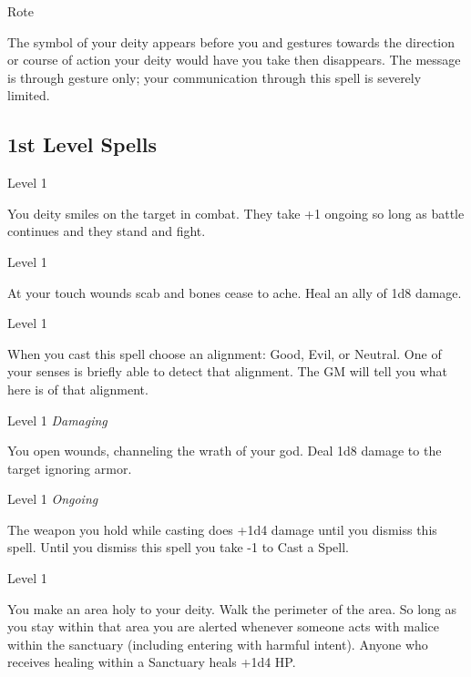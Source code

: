        
\startSpellName
          	Rote
\stopSpellName
       

The symbol of your deity appears before you and gestures towards the direction or course of action your deity would have you take then disappears. The message is through gesture only; your communication through this spell is severely limited.

     

     

       
\subsection{1st Level Spells}     
       
\startSpellName
          	Level 1
\stopSpellName
       

You deity smiles on the target in combat. They take +1 ongoing so long as battle continues and they stand and fight.

       
\startSpellName
          	Level 1
\stopSpellName
       

At your touch wounds scab and bones cease to ache. Heal an ally of 1d8 damage.

       
\startSpellName
          	Level 1
\stopSpellName
       

When you cast this spell choose an alignment: Good, Evil, or Neutral. One of your senses is briefly able to detect that alignment. The GM will tell you what here is of that alignment.

       
\startSpellName
          	Level 1	{\em Damaging} 
\stopSpellName
       

You open wounds, channeling the wrath of your god. Deal 1d8 damage to the target ignoring armor.

       
\startSpellName
          	Level 1	 {\em Ongoing} 
\stopSpellName
       

The weapon you hold while casting does +1d4 damage until you dismiss this spell. Until you dismiss this spell you take -1 to Cast a Spell.

       
\startSpellName
          	Level 1
\stopSpellName
       

You make an area holy to your deity. Walk the perimeter of the area. So long as you stay within that area you are alerted whenever someone acts with malice within the sanctuary (including entering with harmful intent). Anyone who receives healing within a Sanctuary heals +1d4 HP.

